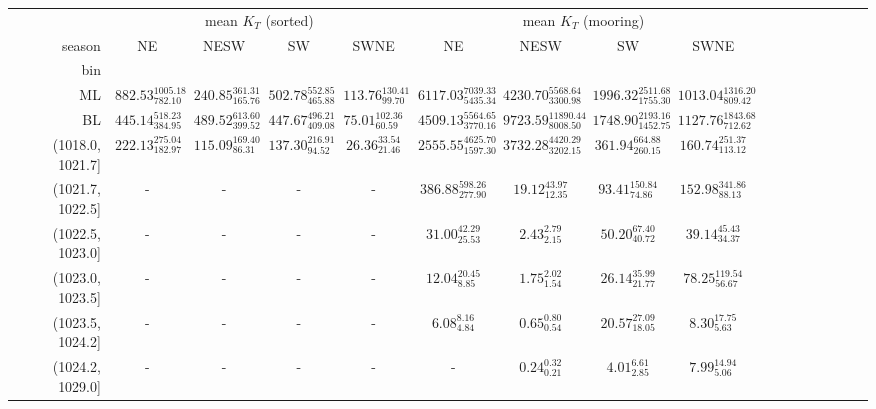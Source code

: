 \begin{tabular}{@{\extracolsep\fill}rcccccccccccccccc}
\toprule
{} & \multicolumn{4}{c}{mean $K_T$ (sorted)} & \multicolumn{4}{c}{mean $K_T$ (mooring)} \\
season &                           NE &                        NESW &                          SW &                       SWNE &                             NE &                            NESW &                             SW &                          SWNE \\
bin              &                              &                             &                             &                            &                                &                                 &                                &                               \\
\midrule
ML               &  $882.53_{782.10}^{1005.18}$ &  $240.85_{165.76}^{361.31}$ &  $502.78_{465.88}^{552.85}$ &  $113.76_{99.70}^{130.41}$ &  $6117.03_{5435.34}^{7039.33}$ &   $4230.70_{3300.98}^{5568.64}$ &  $1996.32_{1755.30}^{2511.68}$ &  $1013.04_{809.42}^{1316.20}$ \\
BL               &   $445.14_{384.95}^{518.23}$ &  $489.52_{399.52}^{613.60}$ &  $447.67_{409.08}^{496.21}$ &   $75.01_{60.59}^{102.36}$ &  $4509.13_{3770.16}^{5564.65}$ &  $9723.59_{8008.50}^{11890.44}$ &  $1748.90_{1452.75}^{2193.16}$ &  $1127.76_{712.62}^{1843.68}$ \\
(1018.0, 1021.7] &   $222.13_{182.97}^{275.04}$ &   $115.09_{86.31}^{169.40}$ &   $137.30_{94.52}^{216.91}$ &    $26.36_{21.46}^{33.54}$ &  $2555.55_{1597.30}^{4625.70}$ &   $3732.28_{3202.15}^{4420.29}$ &     $361.94_{260.15}^{664.88}$ &    $160.74_{113.12}^{251.37}$ \\
(1021.7, 1022.5] &                            - &                           - &                           - &                          - &     $386.88_{277.90}^{598.26}$ &         $19.12_{12.35}^{43.97}$ &       $93.41_{74.86}^{150.84}$ &     $152.98_{88.13}^{341.86}$ \\
(1022.5, 1023.0] &                            - &                           - &                           - &                          - &        $31.00_{25.53}^{42.29}$ &            $2.43_{2.15}^{2.79}$ &        $50.20_{40.72}^{67.40}$ &       $39.14_{34.37}^{45.43}$ \\
(1023.0, 1023.5] &                            - &                           - &                           - &                          - &         $12.04_{8.85}^{20.45}$ &            $1.75_{1.54}^{2.02}$ &        $26.14_{21.77}^{35.99}$ &      $78.25_{56.67}^{119.54}$ \\
(1023.5, 1024.2] &                            - &                           - &                           - &                          - &           $6.08_{4.84}^{8.16}$ &            $0.65_{0.54}^{0.80}$ &        $20.57_{18.05}^{27.09}$ &         $8.30_{5.63}^{17.75}$ \\
(1024.2, 1029.0] &                            - &                           - &                           - &                          - &          - &            $0.24_{0.21}^{0.32}$ &           $4.01_{2.85}^{6.61}$ &         $7.99_{5.06}^{14.94}$ \\
\bottomrule
\end{tabular}
